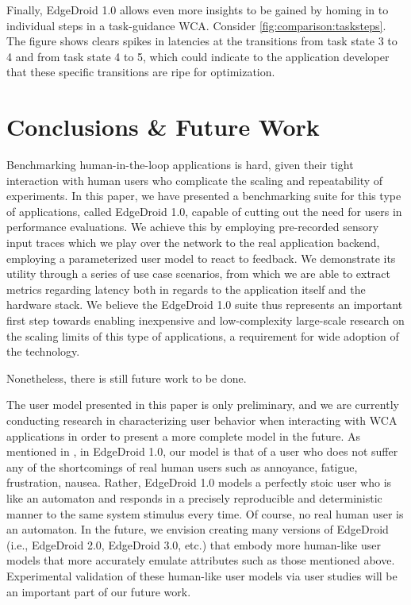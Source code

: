 Finally, EdgeDroid 1.0 allows even more insights to be gained by homing in to individual steps in a task-guidance WCA. Consider \cref{fig:comparison:tasksteps}.
The figure shows clears spikes in latencies at the transitions from task state 3 to 4 and from task state 4 to 5, which could indicate to the application developer that these specific transitions are ripe for optimization.

\section{Conclusions \& Future Work}\label{sec:conclusions}

Benchmarking human-in-the-loop applications is hard, given their tight interaction with human users who complicate the scaling and repeatability of experiments.
In this paper, we have presented a benchmarking suite for this type of applications, called EdgeDroid 1.0, capable of cutting out the need for users in performance evaluations.
We achieve this by employing pre-recorded sensory input traces which we play over the network to the real application backend, employing a parameterized user model to react to feedback.
We demonstrate its utility through a series of use case scenarios, from which we are able to extract metrics regarding latency both in regards to the application itself and the hardware stack.
We believe the EdgeDroid 1.0 suite thus represents an important first step towards enabling inexpensive and low-complexity large-scale research on the scaling limits of this type of applications, a requirement for wide adoption of the technology.

Nonetheless, there is still future work to be done.

The user model presented in this paper is only preliminary, and we are currently conducting research in characterizing user behavior when interacting with WCA applications in order to present a more complete model in the future.
As mentioned in , in EdgeDroid 1.0, our model is that of a user who does not suffer any of the shortcomings of real human users such as annoyance, fatigue, frustration, nausea.
Rather, EdgeDroid 1.0 models a perfectly stoic user who is like an automaton and responds in a precisely reproducible and deterministic manner to the same system stimulus every time.
Of course, no real human user is an automaton.
In the future, we envision creating  many versions of EdgeDroid (i.e., EdgeDroid 2.0, EdgeDroid 3.0, etc.) that embody more human-like user models that more accurately emulate attributes such as those mentioned above.
Experimental validation of these human-like user models via user studies will be an important part of our future work.

